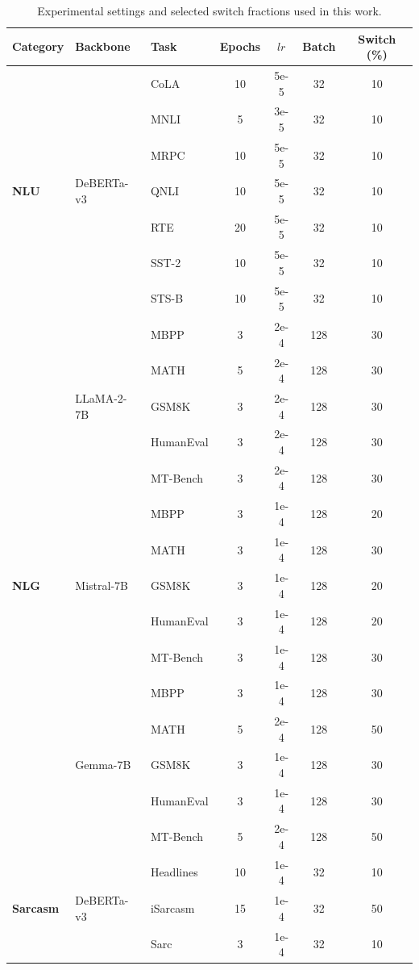 \documentclass{article}
\begin{document}
\begin{table}[!ht]
\caption{Experimental settings and selected switch fractions used in this work.}
\label{tab:master_experimental_settings_v2}
\centering
\scriptsize
\begin{tabular}{lllcccc}
\toprule
\textbf{Category} & \textbf{Backbone} & \textbf{Task} & \textbf{Epochs} & \textbf{$lr$} & \textbf{Batch} & \textbf{Switch (\%)} \\
\midrule
\multirow{7}{*}{\textbf{NLU}}
& \multirow{7}{*}{DeBERTa-v3}
& CoLA      & 10 & 5e-5 & 32 & 10 \\
& & MNLI      & 5  & 3e-5 & 32 & 10 \\
& & MRPC      & 10 & 5e-5 & 32 & 10 \\
& & QNLI      & 10 & 5e-5 & 32 & 10 \\
& & RTE       & 20 & 5e-5 & 32 & 10 \\
& & SST-2     & 10 & 5e-5 & 32 & 10 \\
& & STS-B     & 10 & 5e-5 & 32 & 10 \\
\midrule
\multirow{15}{*}{\textbf{NLG}}
& \multirow{5}{*}{LLaMA-2-7B}
& MBPP      & 3 & 2e-4 & 128 & 30 \\
& & MATH      & 5 & 2e-4 & 128 & 30 \\
& & GSM8K     & 3 & 2e-4 & 128 & 30 \\
& & HumanEval & 3 & 2e-4 & 128 & 30 \\
& & MT-Bench  & 3 & 2e-4 & 128 & 30 \\
\cmidrule{2-7}
& \multirow{5}{*}{Mistral-7B}
& MBPP      & 3 & 1e-4 & 128 & 20 \\
& & MATH      & 3 & 1e-4 & 128 & 30 \\
& & GSM8K     & 3 & 1e-4 & 128 & 20 \\
& & HumanEval & 3 & 1e-4 & 128 & 20 \\
& & MT-Bench  & 3 & 1e-4 & 128 & 30 \\
\cmidrule{2-7}
& \multirow{5}{*}{Gemma-7B}
& MBPP      & 3 & 1e-4 & 128 & 30 \\
& & MATH      & 5 & 2e-4 & 128 & 50 \\
& & GSM8K     & 3 & 1e-4 & 128 & 30 \\
& & HumanEval & 3 & 1e-4 & 128 & 30 \\
& & MT-Bench  & 5 & 2e-4 & 128 & 50 \\
\midrule
\multirow{3}{*}{\textbf{Sarcasm}}
& \multirow{3}{*}{DeBERTa-v3}
& Headlines & 10 & 1e-4 & 32 & 10 \\
& & iSarcasm  & 15 & 1e-4 & 32 & 50 \\
& & Sarc      & 3  & 1e-4 & 32 & 10 \\
\bottomrule
\end{tabular}
\end{table}
\end{document}
